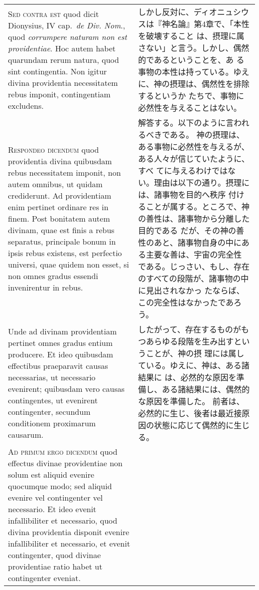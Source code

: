 \documentclass[10pt]{jsarticle} %
\begin{document}
\begin{longtable}{p{21em}p{21em}}
{\scshape Sed contra est} quod dicit Dionysius, IV
cap.~{\itshape de Div. Nom}., quod {\itshape corrumpere naturam non est providentiae}. Hoc
autem habet quarundam rerum natura, quod sint contingentia. Non igitur
divina providentia necessitatem rebus imponit, contingentiam excludens.

&


しかし反対に、ディオニュシウスは『神名論』第4章で、「本性を破壊すること
 は、摂理に属さない」と言う。しかし、偶然的であるということを、あ
 る事物の本性は持っている。ゆえに、神の摂理は、偶然性を排除するというか
 たちで、事物に必然性を与えることはない。


\\


{\scshape Respondeo dicendum} quod providentia divina
quibusdam rebus necessitatem imponit, non autem omnibus, ut quidam
crediderunt. Ad providentiam enim pertinet ordinare res in finem. Post
bonitatem autem divinam, quae est finis a rebus separatus, principale
bonum in ipsis rebus existens, est perfectio universi, quae quidem non
esset, si non omnes gradus essendi invenirentur in rebus. 


&

解答する。以下のように言われるべきである。
神の摂理は、ある事物に必然性を与えるが、ある人々が信じていたように、すべ
 てに与えるわけではない。理由は以下の通り。摂理には、諸事物を目的へ秩序
 付けることが属する。ところで、神の善性は、諸事物から分離した目的である
 だが、その神の善性のあと、諸事物自身の中にある主要な善は、宇宙の完全性
 である。じっさい、もし、存在のすべての段階が、諸事物の中に見出されなかっ
 たならば、この完全性はなかったであろう。


\\

Unde ad
divinam providentiam pertinet omnes gradus entium producere. Et ideo
quibusdam effectibus praeparavit causas necessarias, ut necessario
evenirent; quibusdam vero causas contingentes, ut evenirent
contingenter, secundum conditionem proximarum causarum.

&

したがって、存在するものがもつあらゆる段階を生み出すということが、神の摂
 理には属している。ゆえに、神は、ある諸結果に
 は、必然的な原因を準備し、ある諸結果には、偶然的な原因を準備した。
前者は、必然的に生じ、後者は最近接原因の状態に応じて偶然的に生じる。


\\


{\scshape Ad primum ergo dicendum} quod effectus divinae
providentiae non solum est aliquid evenire quocumque modo; sed aliquid
evenire vel contingenter vel necessario. Et ideo evenit infallibiliter
et necessario, quod divina providentia disponit evenire infallibiliter
et necessario, et evenit contingenter, quod divinae providentiae ratio
habet ut contingenter eveniat.


\end{longtable}
\end{document}
